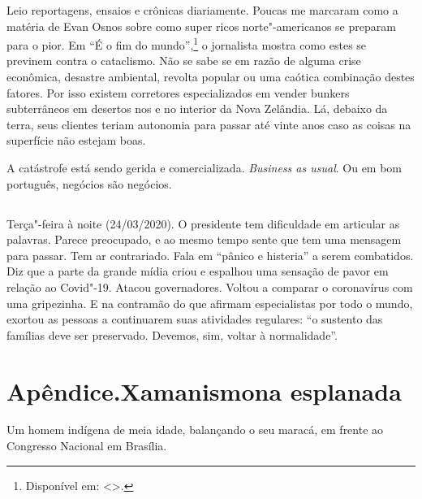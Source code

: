 Leio reportagens, ensaios e crônicas diariamente. Poucas me marcaram
como a matéria de Evan Osnos sobre como super ricos norte"-americanos se
preparam para o pior. Em
``É o fim do mundo'',\footnote{Disponível em: \textless{}{}\textgreater{}.} o jornalista mostra como estes se previnem contra o
cataclismo. Não se sabe se em razão de alguma crise econômica, desastre
ambiental, revolta popular ou uma caótica combinação destes fatores. Por
isso existem corretores especializados em vender bunkers subterrâneos em
desertos nos  e no interior da Nova Zelândia. Lá, debaixo da terra,
seus clientes teriam autonomia para passar até vinte anos caso as coisas
na superfície não estejam boas.

A catástrofe está sendo gerida e comercializada. \emph{Business as
usual}. Ou em bom português, negócios são negócios.

\section*{\vspace*{-.1cm}\break {}\vspace*{-.1cm}\break {}}

Terça"-feira à noite (24/03/2020). O presidente tem dificuldade em
articular as palavras. Parece preocupado, e ao mesmo tempo sente que tem
uma mensagem para passar. Tem ar contrariado. Fala em ``pânico e
histeria'' a serem combatidos. Diz que a parte da grande mídia criou
e espalhou uma sensação de pavor em relação ao Covid"-19. Atacou
governadores. Voltou a comparar o coronavírus com uma gripezinha. E na
contramão do que afirmam especialistas por todo o mundo, exortou as
pessoas a continuarem suas atividades regulares: ``o sustento das
famílias deve ser preservado. Devemos, sim, voltar à normalidade''. \enlargethispage{\baselineskip}


\chapter*{Apêndice.\vspace{-.15cm}\break Xamanismo\vspace{-.15cm}\break na esplanada}

\noindent{}Um homem indígena de meia idade, balançando o seu maracá, em frente ao
Congresso Nacional em Brasília.

